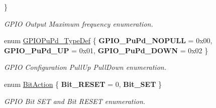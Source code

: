 \begin{DoxyCompactItemize}
 \}
\begin{DoxyCompactList}\small\item\em G\+P\+IO Output Maximum frequency enumeration. \end{DoxyCompactList}\item 
\mbox{\label{group___g_p_i_o_gafb7ecd99c44b4fd702d669304a36c2c8}} 
enum \mbox{\hyperlink{group___g_p_i_o_gafb7ecd99c44b4fd702d669304a36c2c8}{G\+P\+I\+O\+Pu\+Pd\+\_\+\+Type\+Def}} \{ {\bfseries G\+P\+I\+O\+\_\+\+Pu\+Pd\+\_\+\+N\+O\+P\+U\+LL} = 0x00, 
{\bfseries G\+P\+I\+O\+\_\+\+Pu\+Pd\+\_\+\+UP} = 0x01, 
{\bfseries G\+P\+I\+O\+\_\+\+Pu\+Pd\+\_\+\+D\+O\+WN} = 0x02
 \}
\begin{DoxyCompactList}\small\item\em G\+P\+IO Configuration Pull\+Up Pull\+Down enumeration. \end{DoxyCompactList}\item 
\mbox{\label{group___g_p_i_o_ga176130b21c0e719121470a6042d4cf19}} 
enum \mbox{\hyperlink{group___g_p_i_o_ga176130b21c0e719121470a6042d4cf19}{Bit\+Action}} \{ {\bfseries Bit\+\_\+\+R\+E\+S\+ET} = 0, 
{\bfseries Bit\+\_\+\+S\+ET}
 \}
\begin{DoxyCompactList}\small\item\em G\+P\+IO Bit S\+ET and Bit R\+E\+S\+ET enumeration. \end{DoxyCompactList}\end{DoxyCompactItemize}
